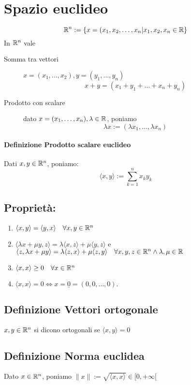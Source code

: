 \documentclass[a4paper]{article}
\begin{document}
\section{Spazio euclideo}
$$
\mathbb{R} ^ n := \{ x = (x_1, x_2, \dots , x_n | x_1, x_2, x_n \in \mathbb{R} \}
$$	
In $ \mathbb{R} ^ n $ vale 

\begin{description}
	\item [Somma tra vettori] $ x = (x_1,\dots,x_2) , y = (y_1, ... , y_n) $
		$$
		x+y=(x_1+y_1 + \dots + x_n + y_n )
		$$
	\item [Prodotto  con scalare] dato $ x=(x_1, \dots , x_n) , \lambda \in \mathbb{R} $, poniamo
		$$
		\lambda x:=( \lambda x_1, \dots , \lambda x_n )
		$$
\end{description}

\paragraph{Definizione Prodotto scalare euclideo} Dati $x , y \in \mathbb{R} ^ n $, poniamo:
$$
\langle x,y \rangle := \sum_{k=1}^n x_k y_k
$$

\subsection{ Proprietà: }

\begin{enumerate}
	\item %
		$\langle x,y \rangle = \langle y,x \rangle \quad \forall x,y \in \mathbb{R} ^n $ 

	\item %
		$ \langle \lambda x + \mu y , z \rangle = \lambda \langle x ,z \rangle + \mu \langle y,z \rangle $ e
		$ \langle z, \lambda x + \mu y \rangle = \lambda \langle z,x \rangle + \mu \langle z,y \rangle \quad \forall x,y,z \in \mathbb{R} ^ n \land \lambda , \mu \in \mathbb{R} $
		\item $ \langle x,x \rangle \ge 0 \quad \forall x \in \mathbb{R} ^ n $
		\item $ \langle x,x \rangle = 0 \iff x= \underline{0} = (0,0,\dots, 0). $
\end{enumerate}

\subsection { Definizione Vettori ortogonale} $x,y \in \mathbb{R} ^n $ si dicono ortogonali se $ \langle x,y \rangle = 0$

\subsection { Definizione Norma euclidea }
Dato $ x \in \mathbb{R} ^n $, poniamo $ \|x \| := \sqrt{\langle x,x \rangle } \in [0, + \infty [$
\end{document}
